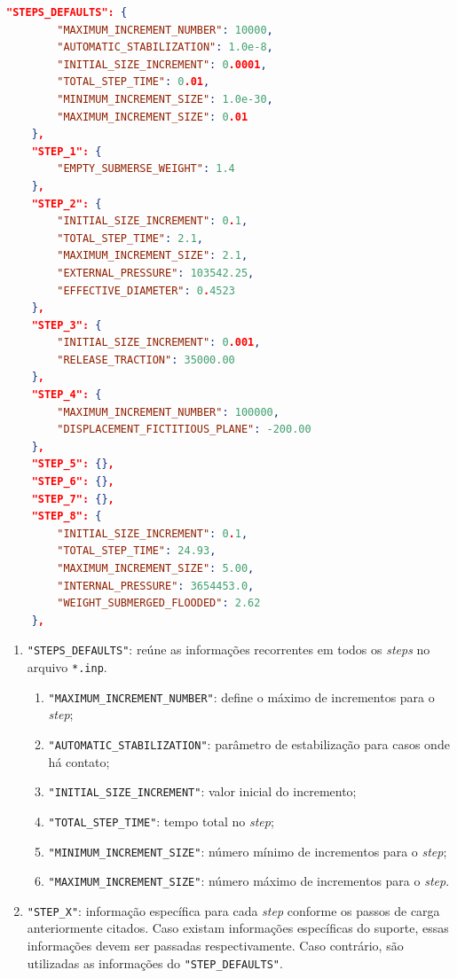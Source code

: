 \begin{lstlisting}[firstnumber=137, language=json, label={tab:jdsn-arquivojson5}, caption={Exemplo de arquivo de entrada de dados - Parte 5/7}]
    "STEPS_DEFAULTS": {
        "MAXIMUM_INCREMENT_NUMBER": 10000,
        "AUTOMATIC_STABILIZATION": 1.0e-8,
        "INITIAL_SIZE_INCREMENT": 0.0001,
        "TOTAL_STEP_TIME": 0.01,
        "MINIMUM_INCREMENT_SIZE": 1.0e-30,
        "MAXIMUM_INCREMENT_SIZE": 0.01
    },
    "STEP_1": {
        "EMPTY_SUBMERSE_WEIGHT": 1.4
    },
    "STEP_2": {
        "INITIAL_SIZE_INCREMENT": 0.1,
        "TOTAL_STEP_TIME": 2.1,
        "MAXIMUM_INCREMENT_SIZE": 2.1,
        "EXTERNAL_PRESSURE": 103542.25,
        "EFFECTIVE_DIAMETER": 0.4523
    },
    "STEP_3": {
        "INITIAL_SIZE_INCREMENT": 0.001,
        "RELEASE_TRACTION": 35000.00
    },
    "STEP_4": {
        "MAXIMUM_INCREMENT_NUMBER": 100000,
        "DISPLACEMENT_FICTITIOUS_PLANE": -200.00
    },
    "STEP_5": {},
    "STEP_6": {},
    "STEP_7": {},
    "STEP_8": {
        "INITIAL_SIZE_INCREMENT": 0.1,
        "TOTAL_STEP_TIME": 24.93,
        "MAXIMUM_INCREMENT_SIZE": 5.00,
        "INTERNAL_PRESSURE": 3654453.0,
        "WEIGHT_SUBMERGED_FLOODED": 2.62
    },
\end{lstlisting}

\begin{enumerate}
    \item \texttt{"STEPS\_DEFAULTS"}: reúne as informações recorrentes em todos os \textit{steps} no arquivo \texttt{*.inp}.
    \begin{enumerate}
        \item \texttt{"MAXIMUM\_INCREMENT\_NUMBER"}: define o máximo de incrementos para o \textit{step};
        \item \texttt{"AUTOMATIC\_STABILIZATION"}: parâmetro de estabilização para casos onde há contato;
        \item \texttt{"INITIAL\_SIZE\_INCREMENT"}: valor inicial do incremento;
        \item \texttt{"TOTAL\_STEP\_TIME"}: tempo total no \textit{step};
        \item \texttt{"MINIMUM\_INCREMENT\_SIZE"}: número mínimo de incrementos para o \textit{step};
        \item \texttt{"MAXIMUM\_INCREMENT\_SIZE"}: número máximo de incrementos para o \textit{step}.
    \end{enumerate}
    \item \texttt{"STEP\_X"}: informação específica para cada \textit{step} conforme os passos de carga anteriormente citados. Caso existam informações específicas do suporte, essas informações devem ser passadas respectivamente. Caso contrário, são utilizadas as informações do \texttt{"STEP\_DEFAULTS"}.
\end{enumerate}

